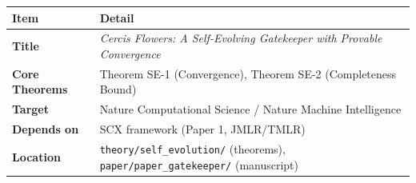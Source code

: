 \documentclass[
  12pt,
]{article}
\begin{document}
\begin{longtable}[]{@{}
  >{\raggedright\arraybackslash}p{}
  >{\raggedright\arraybackslash}p{}@{}}
\toprule\noalign{}
\begin{minipage}[b]{\linewidth}\raggedright
Item
\end{minipage} & \begin{minipage}[b]{\linewidth}\raggedright
Detail
\end{minipage} \\
\midrule\noalign{}
\endhead
\bottomrule\noalign{}
\endlastfoot
\textbf{Title} & \emph{Cercis Flowers: A Self-Evolving Gatekeeper with
Provable Convergence} \\
\textbf{Core Theorems} & Theorem SE-1 (Convergence), Theorem SE-2
(Completeness Bound) \\
\textbf{Target} & Nature Computational Science / Nature Machine
Intelligence \\
\textbf{Depends on} & SCX framework (Paper 1, JMLR/TMLR) \\
\textbf{Location} & \texttt{theory/self\_evolution/} (theorems),
\texttt{paper/paper\_gatekeeper/} (manuscript) \\
\end{longtable}
\end{document}

